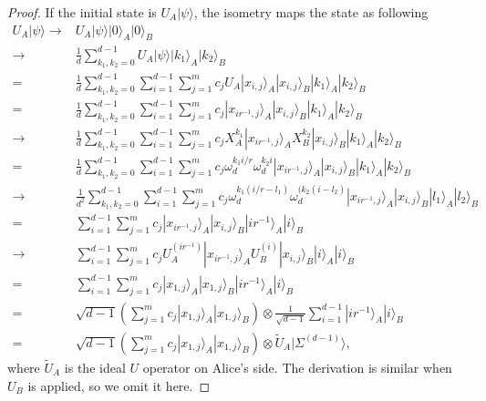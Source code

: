 \documentclass[11pt,letterpaper]{article}
\newcommand{\ket}[1]{|#1\rangle}
\newcommand{\x}{\otimes}
\DeclareMathOperator{\supp}{supp}
\newcommand{\1}{\mathbb{1}}
\newcommand{\CHSH}{CHSH^{(d)}}
\newcommand{\SVT}{SVT}
\newcommand{\EPR}[1]{\Sigma^{(#1)}}
\newcommand{\tU}{\tilde{U}}
\theoremstyle{definition}
\begin{document}
\begin{proof}
If the initial state is $U_A\ket{\psi}$, the isometry maps the state as following
\begin{align}
	U_A\ket{\psi} \to &U_A\ket{\psi}\ket{0}_A\ket{0}_B\\
	\to &\frac{1}{d} \sum_{k_1,k_2 =0}^{d-1} U_A\ket{\psi} \ket{k_1}_A \ket{k_2}_B \\
	= &\frac{1}{d} \sum_{k_1,k_2=0}^{d-1} \sum_{i=1}^{d-1}\sum_{j=1}^m c_j U_A\ket{x_{i,j}}_A\ket{x_{i,j}}_B
		\ket{k_1}_A \ket{k_2}_B\\
	= & \frac{1}{d} \sum_{k_1,k_2=0}^{d-1} \sum_{i=1}^{d-1}\sum_{j=1}^m c_j \ket{x_{i r^{-1} ,j}}_A\ket{x_{i,j}}_B
		\ket{k_1}_A \ket{k_2}_B\\
	\to &\frac{1}{d} \sum_{k_1,k_2 =0}^{d-1} \sum_{i=1}^{d-1}\sum_{j=1}^m c_j X_A^{k_1} \ket{x_{i r^{-1} ,j}}_A
	X_B^{k_2}\ket{x_{i,j}}_B  \ket{k_1}_A \ket{k_2}_B \\
	=&\frac{1}{d} \sum_{k_1,k_2 =0}^{d-1} \sum_{i=1}^{d-1}\sum_{j=1}^m c_j \omega_d^{k_1 i/r}\omega_d^{k_2i} \ket{x_{ir^{-1},j}}_A\ket{x_{i,j}}_B
		\ket{k_1}_A \ket{k_2}_B\\
	\to &\frac{1}{d^2}\sum_{k_1,k_2 =0}^{d-1} \sum_{i=1}^{d-1}\sum_{j=1}^m c_j \omega_d^{k_1(i/r-l_1)}\omega_d^{(k_2(i-l_2)} \ket{x_{ir^{-1},j}}_A\ket{x_{i,j}}_B
		\ket{l_1}_A \ket{l_2}_B\\
	=&\sum_{i=1}^{d-1}\sum_{j=1}^m c_j  \ket{x_{ir^{-1},j}}_A\ket{x_{i,j}}_B \ket{ir^{-1}}_A \ket{i}_B\\
	\to& \sum_{i=1}^{d-1}\sum_{j=1}^m c_j U_A^{(ir^{-1})}\ket{x_{ir^{-1},j}}_A U_B^{(i)}\ket{x_{i,j}}_B \ket{i}_A\ket{i}_B\\
	=&\sum_{i=1}^{d-1}\sum_{j=1}^m c_j \ket{x_{1,j}}_A \ket{x_{1,j}}_B \ket{ir^{-1}}_A\ket{i}_B\\
	=&\sqrt{d-1} \left(\sum_{j=1}^m c_j \ket{x_{1,j}}_A \ket{x_{1,j}}_B\right) \x 
		\frac{1}{\sqrt{d-1}} \sum_{i=1}^{d-1}\ket{ir^{-1}}_A\ket{i}_B\\
	=& \sqrt{d-1} \left(\sum_{j=1}^m c_j \ket{x_{1,j}}_A \ket{x_{1,j}}_B\right) \x \tU_A \ket{\EPR{d-1}},
\end{align}
where $\tU_A$ is the ideal $U$ operator on Alice's side.
The derivation is similar when $U_B$ is applied, so we omit it here.
\end{proof}
\end{document}
